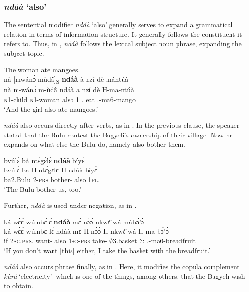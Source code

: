 \subsubsection*{{\itshape ndáà} `also'} The sentential modifier {\itshape ndáà} `also' generally serves to expand a grammatical relation in terms of information structure. It generally follows the constituent it refers to. Thus, in , {\itshape ndáà} follows the lexical subject noun phrase, expanding the subject topic.

\ea \label{ndaa1} The woman ate mangoes.\\
   \glll nà [mwánɔ̀ mùdã̂]\textsubscript{S} {\bfseries ndáà} à nzí dè mántúà \\
      nà {\db}m-wánɔ̀ m-ùdã̂ ndáà a nzí dè H-ma-ntúà \\
       {\COM} {\db}\textsc{n}1-child \textsc{n}1-woman also 1 {\PROG}.{\PST} eat {\OBJ}.{\LINK}-ma6-mango\\
    \trans `And the girl also ate mangoes.'
\z

{\itshape ndáà} also occurs directly after verbs, as in . In the previous clause, the speaker stated that the Bulu contest the Bagyeli's ownership of their village. Now he expands on what else the Bulu do, namely also bother them.

\ea \label{ndaa2}
  \glll bvúlɛ̀ bá ntɛ́gɛ́lɛ́ {\bfseries ndáà} bíyɛ̀ \\
       bvúlɛ̀ ba-H ntɛ́gɛlɛ-H ndáà bíyɛ̀ \\
         ba2.Bulu 2-\textsc{prs} bother-{\R} also 1\textsc{pl}.{\OBJ}   \\
    \trans `The Bulu bother us, too.'
\z

\noindent Further, {\itshape ndáà} is used under negation, as in .

\ea \label{ndaa3}
  \glll ká wɛ̀ɛ́ wúmbɛ́lɛ́ {\bfseries ndáà} mɛ́ nɔ̀ɔ́ nkwɛ̂ wá mábɔ́'ɔ̀ \\
        ká wɛ̀ɛ́ wúmbɛ-lɛ́ ndáà mɛ-H nɔ̀ɔ̀-H nkwɛ̂ wá H-ma-bɔ́'ɔ̀ \\
         if 2\textsc{sg}.\textsc{prs}.{\NEG} want-{\NEG} also 1\textsc{sg}-\textsc{prs} take-{\R} $\emptyset$3.basket 3:{\ATT} {\OBJ}.{\LINK}-ma6-breadfruit\\
    \trans `If you don't want [this] either, I take the basket with the breadfruit.'
\z

{\itshape ndáà} also occurs phrase finally, as in . Here, it modifies the copula complement {\itshape kùrã̂} `electricity', which is one of the things, among others, that the Bagyeli wish to obtain.

